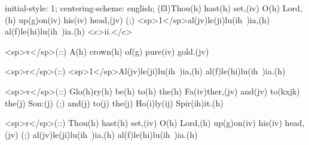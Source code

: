initial-style: 1;
centering-scheme: english;
(f3)Thou(h) hast(h) set,(iv) O(h) Lord,(h) up(g)on(iv) his(iv) head,(jv) (;) <sp>1</sp>al(jv)le(ji)lu(ih~)ia,(h) al(f)le(hi)lu(ih~)ia.(h) <c>ii.</c>

<sp>v</sp>(::) A(h) crown(h) of(g) pure(iv) gold.(jv)

<sp>r</sp>(::) <sp>1</sp>Al(jv)le(ji)lu(ih~)ia,(h) al(f)le(hi)lu(ih~)ia.(h)

<sp>v</sp>(::) Glo(h)ry(h) be(h) to(h) the(h) Fa(iv)ther,(jv) and(jv) to(kxjk) the(j) Son:(j) (;) and(j) to(j) the(j) Ho(i)ly(ij) Spir(ih)it.(h)

<sp>r</sp>(::) Thou(h) hast(h) set,(iv) O(h) Lord,(h) up(g)on(iv) his(iv) head,(jv) (;) al(jv)le(ji)lu(ih~)ia,(h) al(f)le(hi)lu(ih~)ia.(h)